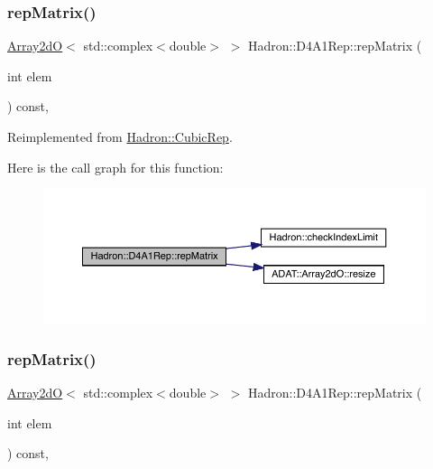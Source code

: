 \subsubsection{\texorpdfstring{repMatrix()}{repMatrix()}\hspace{0.1cm}{\footnotesize\ttfamily [1/3]}}
{\footnotesize\ttfamily \mbox{\hyperlink{classADAT_1_1Array2dO}{Array2dO}}$<$ std\+::complex$<$double$>$ $>$ Hadron\+::\+D4\+A1\+Rep\+::rep\+Matrix (\begin{DoxyParamCaption}\item[{int}]{elem }\end{DoxyParamCaption}) const\hspace{0.3cm}{\ttfamily [inline]}, {\ttfamily [virtual]}}



Reimplemented from \mbox{\hyperlink{structHadron_1_1CubicRep_ac5d7e9e6f4ab1158b5fce3e4ad9e8005}{Hadron\+::\+Cubic\+Rep}}.

Here is the call graph for this function\+:
\nopagebreak
\begin{figure}[H]
\begin{center}
\leavevmode
\includegraphics[width=350pt]{d8/d02/structHadron_1_1D4A1Rep_a4dca745781630db08cee88f37cae21b6_cgraph}
\end{center}
\end{figure}
\mbox{\label{structHadron_1_1D4A1Rep_a4dca745781630db08cee88f37cae21b6}} 
\subsubsection{\texorpdfstring{repMatrix()}{repMatrix()}\hspace{0.1cm}{\footnotesize\ttfamily [2/3]}}
{\footnotesize\ttfamily \mbox{\hyperlink{classADAT_1_1Array2dO}{Array2dO}}$<$ std\+::complex$<$double$>$ $>$ Hadron\+::\+D4\+A1\+Rep\+::rep\+Matrix (\begin{DoxyParamCaption}\item[{int}]{elem }\end{DoxyParamCaption}) const\hspace{0.3cm}{\ttfamily [inline]}, {\ttfamily [virtual]}}



